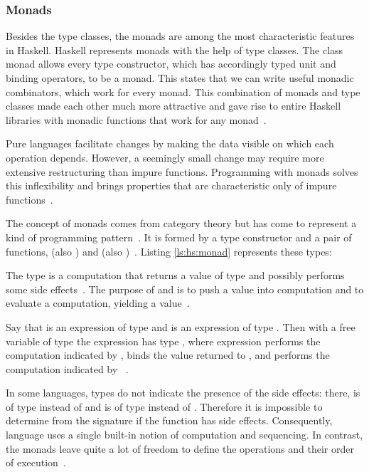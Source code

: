 \begin{frame}\frametitle{Monads}

Besides the type classes, the monads are among the most characteristic features in Haskell. Haskell represents monads with the help of type classes. The class monad allows every type constructor, which has accordingly typed unit and binding operators, to be a monad. 
This states that we can write useful monadic combinators, which work for every monad. 
This combination of monads and type classes made each other much more attractive and gave rise to entire Haskell libraries with monadic functions that work for any monad~\cite{history-of-haskell}. 


Pure languages facilitate changes by making the data visible on which each operation depends. However, a seemingly small change may require more extensive restructuring than impure functions.  Programming with monads solves this inflexibility and brings properties that are characteristic only of impure functions~\cite{essence-of-fp}.

The concept of monads comes from category theory but has come to represent a kind of programming pattern~\cite{essence-of-fp,history-of-haskell}. It  is formed by a type constructor  and a pair of functions,  (also ) and  (also \expr{>>=})~\cite{history-of-haskell,essence-of-fp}. Listing \ref{ls:hs:monad} represents these types:

The type  is a computation that returns a value of type  and possibly performs some side effects~\cite{history-of-haskell}. The purpose of  and  is to push a value into computation and to evaluate a computation, yielding a value~\cite{essence-of-fp}.

Say that  is an expression of type  and  is an expression of type . Then with a free variable  of type  the expression  has type , where expression performs the computation indicated by , binds the value returned to , and performs the computation indicated by ~\cite{history-of-haskell}.

In some languages, types do not indicate the presence of the side effects: there,  is of type  instead of  and  is of type  instead of . Therefore it is impossible to determine from the signature if the function has side effects. Consequently, language uses a single built-in notion of computation and sequencing. In contrast, the monads leave quite a lot of freedom to define the operations and their order of execution~\cite{history-of-haskell}.


\end{frame}
